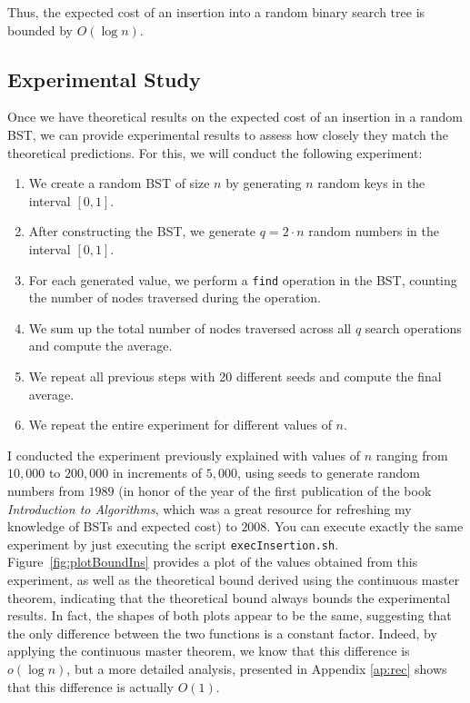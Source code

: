 Thus, the expected cost of an insertion into a random binary search tree is bounded by \( O(\log n) \).

\subsection{Experimental Study}\label{sub:insEx}
Once we have theoretical results on the expected cost of an insertion in a random BST, we can provide experimental results to assess how closely they match the theoretical predictions. For this, we will conduct the following experiment:

\begin{enumerate}
    \item We create a random BST of size \( n \) by generating \( n \) random keys in the interval \( [0,1] \).
    \item After constructing the BST, we generate \( q = 2\cdot n \) random numbers in the interval \( [0,1] \).
    \item For each generated value, we perform a \texttt{find} operation in the BST, counting the number of nodes traversed during the operation.
    \item We sum up the total number of nodes traversed across all \( q \) search operations and compute the average.
    \item We repeat all previous steps with 20 different seeds and compute the final average.
    \item We repeat the entire experiment for different values of \( n \).
\end{enumerate}

I conducted the experiment previously explained with values of \( n \) ranging from \( 10,000 \) to \( 200,000 \) in increments of \( 5,000 \), using seeds to generate random numbers from \( 1989 \) (in honor of the year of the first publication of the book \textit{Introduction to Algorithms}, which was a great resource for refreshing my knowledge of BSTs and expected cost) to \( 2008 \). You can execute exactly the same experiment by just executing the script \texttt{execInsertion.sh}. Figure~\ref{fig:plotBoundIns} provides a plot of the values obtained from this experiment, as well as the theoretical bound derived using the continuous master theorem, indicating that the theoretical bound always bounds the experimental results. In fact, the shapes of both plots appear to be the same, suggesting that the only difference between the two functions is a constant factor. Indeed, by applying the continuous master theorem, we know that this difference is \( o(\log n) \), but a more detailed analysis, presented in Appendix \ref{ap:rec} shows that this difference is actually \( O(1) \).  

